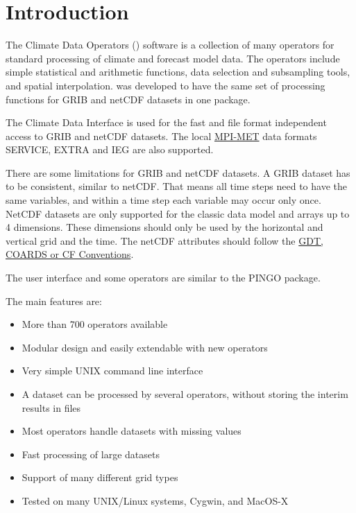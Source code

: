 \chapter{Introduction}

The Climate Data Operators ({\CDO}) software is a collection of many operators
for standard processing of climate and forecast model data.
The operators include simple statistical and arithmetic functions, data selection
and subsampling tools, and spatial interpolation.
{\CDO} was developed to have the same set of processing functions for GRIB \cite{GRIB} and netCDF \cite{netCDF}
datasets in one package.

The Climate Data Interface \cite{CDI} is used for the fast and file format
independent access to GRIB and netCDF datasets.
The local \href{http://www.mpimet.mpg.de/}{MPI-MET} data formats SERVICE, EXTRA and 
IEG are also supported.

There are some limitations for GRIB and netCDF datasets.
A GRIB dataset has to be consistent, similar to netCDF.
That means all time steps need to have the same variables, and
within a time step each variable may occur only once.
NetCDF datasets are only supported for the classic data model and arrays up to 4 dimensions.
These dimensions should only be used by the horizontal and vertical grid and the time.
The netCDF attributes should follow the
\href{http://ftp.unidata.ucar.edu/software/netcdf/docs/conventions.html}
     {GDT, COARDS or CF Conventions}.

The user interface and some operators are similar to the PINGO \cite{PINGO} package.

The main {\CDO} features are:
\begin{itemize}
\item More than 700 operators available
\item Modular design and easily extendable with new operators
\item Very simple UNIX command line interface
\item A dataset can be processed by several operators,
      without storing the interim results in files %
\item Most operators handle datasets with missing values
\item Fast processing of large datasets
\item Support of many different grid types
\item Tested on many UNIX/Linux systems, Cygwin, and MacOS-X
\end{itemize}
















